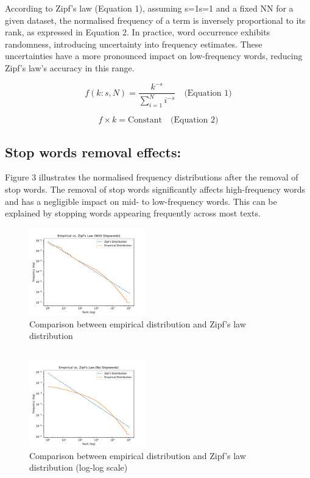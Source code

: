 \documentclass[10pt]{article}
\begin{document}
According to Zipf’s law (Equation 1), assuming s=1s=1 and a fixed NN for a given dataset, the normalised frequency of a term is inversely proportional to its rank, as expressed in Equation 2. In practice, word occurrence exhibits randomness, introducing uncertainty into frequency estimates. These uncertainties have a more pronounced impact on low-frequency words, reducing Zipf’s law’s accuracy in this range.

\[
f(k: s, N) = \frac{k^{-s}}{\sum_{i=1}^{N} i^{-s}} \quad \text{(Equation 1)}
\]

\[
f \times k = \text{Constant} \quad \text{(Equation 2)}
\]

\subsection{Stop words removal effects:}
Figure 3 illustrates the normalised frequency distributions after the removal of stop words. The removal of stop words significantly affects high-frequency words and has a negligible impact on mid- to low-frequency words. This can be explained by stopping words appearing frequently across most texts.

\begin{figure}[ht]
\centering
\includegraphics[width=0.45\textwidth]{Task_1_1_fig.pdf}
\caption{Comparison between empirical distribution
and Zipf’s law distribution}
\end{figure}
\subsection*{}
\begin{figure}[ht]
\centering
\includegraphics[width=0.45\textwidth]{Task_1_2_fig.pdf}
\caption{Comparison between empirical distribution
and Zipf’s law distribution (log-log scale)}
\end{figure}
\end{document}
